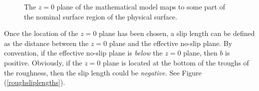 \documentclass[12pt, a4paper, twoside, openright]{book}
\begin{document}
\begin{figure}[ht]
\centering
{}
\caption{The $z=0$ plane of the mathematical model maps to some part of the nominal surface region of the physical surface.}\label{referenceplane}
\end{figure}

Once the location of the $z=0$ plane has been chosen, a slip length can be defined as the distance between the $z=0$ plane and the effective no-slip plane.  By convention, if the effective no-slip plane is \emph{below} the $z=0$ plane, then $b$ is positive.  Obviously, if the $z=0$ plane is located at the bottom of the troughs of the roughness, then the slip length could be \emph{negative.}  See Figure (\ref{roughsliplengths}).
\end{document}
